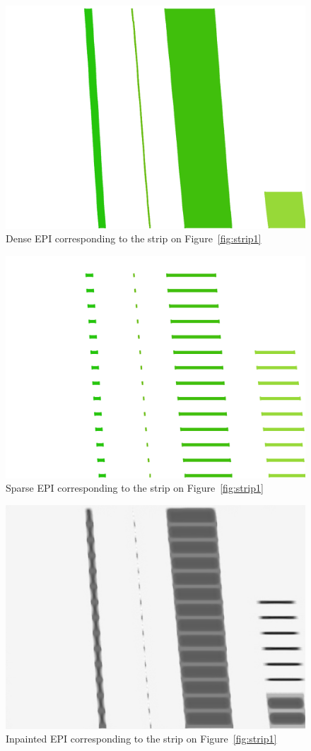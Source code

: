 \begin{itemize}
\begin{figure}[h!]
\centering
\includegraphics[width = 0.7 \textwidth]{./Diagrams/results/EPIs/392_8_102_7_15_4_dense.png}
\caption{Dense EPI corresponding to the strip on Figure~\ref{fig:strip1}}
\label{fig:dense1}
\end{figure}

\begin{figure}[h!]
\centering
\includegraphics[width = 0.7 \textwidth]{./Diagrams/results/EPIs/392_8_102_7_15_4_sparse.png}
\caption{Sparse EPI corresponding to the strip on Figure~\ref{fig:strip1}}
\label{fig:sparse1}
\end{figure}

\begin{figure}[h!]
\centering
\includegraphics[width = 0.7 \textwidth]{./Diagrams/results/Inpainted/392_8_102_7_15_4_inpainted.png}
\caption{Inpainted EPI corresponding to the strip on Figure~\ref{fig:strip1}}
\label{fig:inpainted1}
\end{figure}



\end{itemize}
